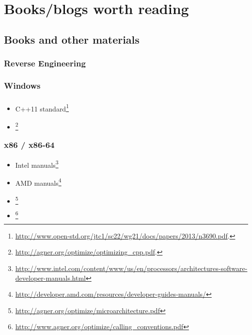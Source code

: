 \part{Books/blogs worth reading}

\chapter{Books and other materials}

\section{Reverse Engineering}



\section{Windows}



\section{\CCpp}

\begin{itemize}
\item C++11 standard\footnote{\AlsoAvailableAs \url{http://www.open-std.org/jtc1/sc22/wg21/docs/papers/2013/n3690.pdf}.}

\item [\AgnerFogCCP]\footnote{\AlsoAvailableAs \url{http://agner.org/optimize/optimizing_cpp.pdf}.}
\end{itemize}

\section{x86 / x86-64}

\label{x86_manuals}
\begin{itemize}
\item Intel manuals\footnote{\AlsoAvailableAs \url{http://www.intel.com/content/www/us/en/processors/architectures-software-developer-manuals.html}}

\item AMD manuals\footnote{\AlsoAvailableAs \url{http://developer.amd.com/resources/developer-guides-manuals/}}

\item \AgnerFog{}\footnote{\AlsoAvailableAs \url{http://agner.org/optimize/microarchitecture.pdf}}

\item \AgnerFogCC{}\footnote{\AlsoAvailableAs \url{http://www.agner.org/optimize/calling_conventions.pdf}}
\end{itemize}

